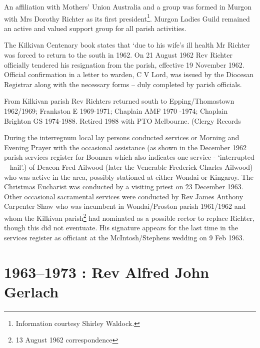 An affiliation with Mothers' Union Australia and a group was formed in Murgon with Mrs Dorothy Richter as its first president\footnote{Information courtesy Shirley Waldock.}. Murgon Ladies Guild remained an active and valued support group for all parish activities.


The Kilkivan Centenary book states that `due to his wife's ill health Mr Richter was forced to return to the south in 1962. On 21 August 1962 Rev Richter officially tendered his resignation from the parish, effective 19 November 1962. Official confirmation in a letter to warden, C V Lord, was issued by the Diocesan Registrar along with the necessary forms -- duly completed by parish officials.



From Kilkivan parish Rev Richters returned south to Epping/Thomastown 1962/1969; Frankston E 1969-1971; Chaplain AMF 1970 -1974; Chaplain Brighton GS 1974-1988. Retired 1988 with PTO Melbourne. (Clergy Records



During the interregnum local lay persons conducted services or Morning and Evening Prayer with the occasional assistance (as shown in the December 1962 parish services register for Boonara which also indicates one service - `interrupted -- hail'.) of Deacon Fred Ailwood (later the Venerable Frederick Charles Ailwood) who was active in the area, possibly stationed at either Wondai or Kingaroy. The Christmas Eucharist was conducted by a visiting priest on 23 December 1963. Other occasional sacramental services were conducted by Rev James Anthony Carpenter Shaw who was incumbent in Wondai/Proston parish 1961/1962 and whom the Kilkivan parish\footnote{13 August 1962 correspondence} had nominated as a possible rector to replace Richter, though this did not eventuate. His signature appears for the last time in the services register as officiant at the McIntosh/Stephens wedding on 9 Feb 1963.


\balance


\printendnotes[custom]
\setcounter{endnote}{0}
\chapter{1963--1973 : Rev Alfred John Gerlach}
\nobalance


